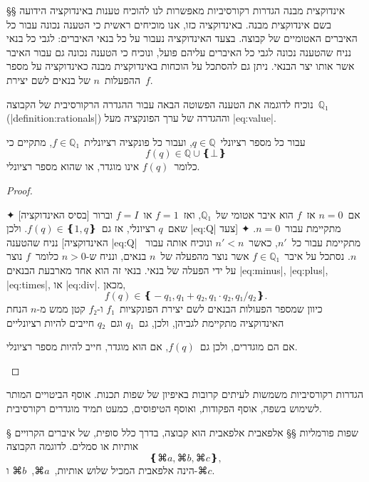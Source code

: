 §§ אינדוקצית מבנה
הגדרות רקורסיביות מאפשרות לנו להוכיח טענות באינדוקציה הידועה בשם אינדוקצית
מבנה. באינדוקציה כזו, אנו מוכיחים ראשית כי הטענה נכונה עבור כל האיברים האטומיים
של קבוצה. בצעד האינדוקציה נעבור על כל בנאי האיברים: לגבי כל בנאי נניח שהטענה
נכונה לגבי כל האיברים עליהם פועל, ונוכיח כי הטענה נכונה גם עבור האיבר אשר אותו
יצר הבנאי. ניתן גם להסתכל על הוכחות באינדוקצית מבנה כאינדוקציה על מספר
ההפעלות~$n$ של בנאים לשם יצירת~$f$.

נוכיח לדוגמה את הטענה הפשוטה הבאה עבור ההגדרה הרקורסיבית של הקבוצה~$ℚ₁$
(|definition:rationals|) וההגדרה של ערך הפונקציה מעל |eq:value|.

\begin{claim}
  עבור כל מספר רציונלי~$q∈ℚ$, ועבור כל פונקציה רציונלית~$f∈ℚ₁$, מתקיים כי
  \begin{equation}\label{eq:Q}
    f(q)∈ℚ∪❴⊥❵
  \end{equation}
  כלומר~$f(q)$ אינו מוגדר, או שהוא מספר רציונלי.
\end{claim}

\begin{proof}
  \mbox{}
  \begin{description}
    ✦ [בסיס האינדוקציה] אם~$n=0$ אז~$f$ הוא איבר אטומי של~$ℚ₁$,
    ואז~$f=1$ או~$f=I$ וברור שאם~$q$ רציונלי, אז גם~$f(q)∈❴1,q❵$. ולכן
    |eq:Q| מתקיימת עבור~$n=0$.
    ✦ [צעד האינדוקציה] נניח שהטענה |eq:Q| מתקיימת עבור כל~$n'$, כאשר~$n'<n$
    ונוכיח אותה עבור~$n$.
    נסתכל על איבר~$f∈ℚ₁$ אשר נוצר מהפעלה של~$n$ בנאים, ונניח ש-$n>0$ כלומר~$f$
    נוצר על ידי הפעלה של בנאי. בנאי זה הוא אחד מארבעת הבנאים |eq:minus|,
    |eq:plus|, |eq:times|, או |eq:div|.
    מכאן, \[
      f(q)∈❴-q₁,q₁+q₂,q₁·q₂,q₁/q₂❵.
\] כיוון שמספר הפעולות הבנאים לשם יצירת הפונקציות~$f₁$ ו-$f₂$ קטן ממש מ-$n$
    הנחת האינדוקציה מתקיימת לגביהן, ולכן, גם~$q₁$ וגם~$q₂$ חייבים להיות רציונליים

    אם הם מוגדרים, ולכן גם~$f(q)$,
    אם הוא מוגדר, חייב
    להיות מספר רציונלי.
  \end{description}
\end{proof}

הגדרות רקורסיביות משמשות לעיתים קרובות באיפיון של שפות תכנות. אוסף הביטויים
המותר לשימוש בשפה, אוסף הפקודות, ואוסף הטיפוסים, כמעט תמיד מוגדרים רקורסיבית.

§ שפות פורמליות 
§§ אלפאבית
אלפאבית הוא קבוצה, בדרך כלל סופית, של איברים הקרויים אותיות או סמלים. לדוגמה
הקבוצה
\begin{equation*}
  ❴⌘a,⌘b,⌘c❵,
\end{equation*}
הינה אלפאבית המכיל שלוש אותיות,~$⌘a$,~$⌘b$ ו-$⌘c$.


